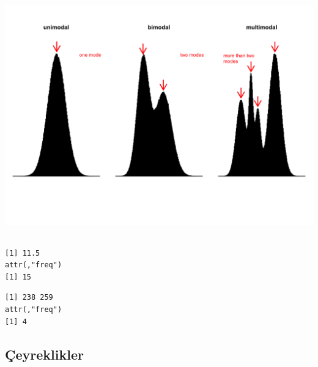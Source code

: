 \documentclass[
  letterpaper,
  DIV=11,
  numbers=noendperiod]{scrreprt}
\newenvironment{Shaded}{\begin{snugshade}}{\end{snugshade}}
\newcommand{\AttributeTok}[1]{\textcolor[rgb]{0.40,0.45,0.13}{#1}}
\newcommand{\CommentTok}[1]{\textcolor[rgb]{0.37,0.37,0.37}{#1}}
\newcommand{\ConstantTok}[1]{\textcolor[rgb]{0.56,0.35,0.01}{#1}}
\newcommand{\FunctionTok}[1]{\textcolor[rgb]{0.28,0.35,0.67}{#1}}
\newcommand{\NormalTok}[1]{\textcolor[rgb]{0.00,0.23,0.31}{#1}}
\newcommand{\SpecialCharTok}[1]{\textcolor[rgb]{0.37,0.37,0.37}{#1}}
\begin{document}
\begin{center}
\includegraphics[width=7.125in,height=4.10417in]{images/mode.png}
\end{center}

\begin{Shaded}
\end{Shaded}

\begin{verbatim}
[1] 11.5
attr(,"freq")
[1] 15
\end{verbatim}

\begin{Shaded}
\end{Shaded}

\begin{verbatim}
[1] 238 259
attr(,"freq")
[1] 4
\end{verbatim}

\subsection*{Çeyreklikler}\label{uxe7eyreklikler}
\end{document}
